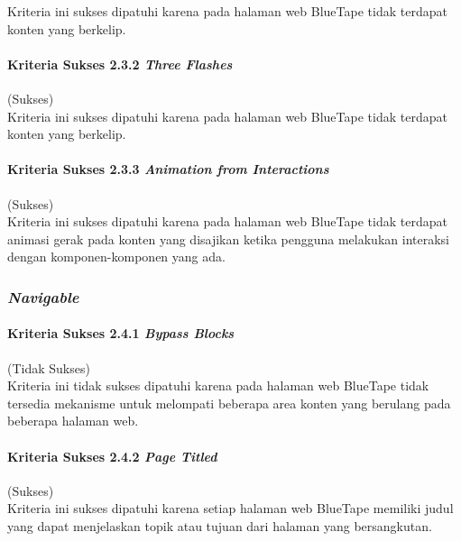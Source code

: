 \documentclass[a4paper,twoside]{article}
\begin{document}
\begin{enumerate}
		Kriteria ini sukses dipatuhi karena pada halaman web BlueTape tidak terdapat konten yang berkelip.

		\paragraph{Kriteria Sukses 2.3.2 \textit{Three Flashes}}
		\label{par:kepatuhan_bluetape_kriteria_sukses_2.3.2}
		(Sukses)\\

		Kriteria ini sukses dipatuhi karena pada halaman web BlueTape tidak terdapat konten yang berkelip.

		\paragraph{Kriteria Sukses 2.3.3 \textit{Animation from Interactions}}
		\label{par:kepatuhan_bluetape_kriteria_sukses_2.3.3}
		(Sukses)\\

		Kriteria ini sukses dipatuhi karena pada halaman web BlueTape tidak terdapat animasi gerak pada konten yang disajikan ketika pengguna melakukan interaksi dengan komponen-komponen yang ada.

		\subsubsection*{\textit{Navigable}}
		\label{subsubsec:kepatuhan_bluetape_navigable}

		\paragraph{Kriteria Sukses 2.4.1 \textit{Bypass Blocks}}
		\label{par:kepatuhan_bluetape_kriteria_sukses_2.4.1}
		(Tidak Sukses)\\

		Kriteria ini tidak sukses dipatuhi karena pada halaman web BlueTape tidak tersedia mekanisme untuk melompati beberapa area konten yang berulang pada beberapa halaman web.

		\paragraph{Kriteria Sukses 2.4.2 \textit{Page Titled}}
		\label{par:kepatuhan_bluetape_kriteria_sukses_2.4.2}
		(Sukses)\\

		Kriteria ini sukses dipatuhi karena setiap halaman web BlueTape memiliki judul yang dapat menjelaskan topik atau tujuan dari halaman yang bersangkutan.


\end{enumerate}
\end{document}
